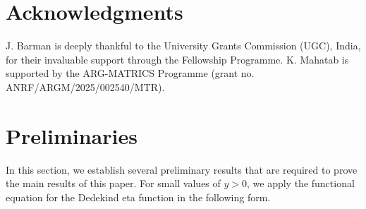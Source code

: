 \documentclass[10pt,a4paper]{amsart}
\newtheorem{lemma}[theorem]{Lemma}
\numberwithin{equation}{section}
\begin{document}
	
	\section{Acknowledgments}
	J. Barman is deeply thankful to the University Grants Commission (UGC), India, for their invaluable support through the Fellowship Programme. K. Mahatab is supported by the ARG-MATRICS Programme (grant no. ANRF/ARGM/2025/002540/MTR).
	\section{Preliminaries}
	In this section, we establish several preliminary results that are required to prove the main results of this paper. 	
	For small values of $y > 0$, we apply the functional equation for the Dedekind eta function in the following form.
	
\end{document}
